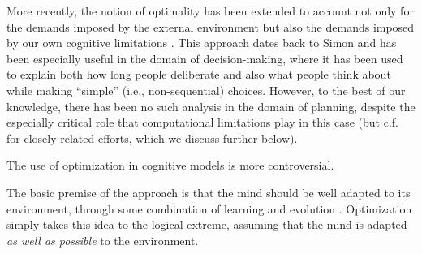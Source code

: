 More recently, the notion of optimality has been extended to account not only for the demands imposed by the external environment but also the demands imposed by our own cognitive limitations \citep{howes2009rational,lewis2014computational,gershman2015computational,griffiths2015rational,lieder2020resourcerational}. This approach dates back to Simon \citep{simon1955behavioral} and has been especially useful in the domain of decision-making, where it has been used to explain both how long people deliberate \citep{bogacz2006physics,drugowitsch2012cost,tajima2016optimal,tajima2019optimal,fudenberg2018speed} and also what people think about \citep{callaway2021fixation,jang2021optimal} while making ``simple'' (i.e., non-sequential) choices. However, to the best of our knowledge, there has been no such analysis in the domain of planning, despite the especially critical role that computational limitations play in this case (but c.f. \citep{sezener2019optimizing,mattar2018prioritized} for closely related efforts, which we discuss further below).


The use of optimization in cognitive models is more controversial. 


The basic premise of the approach is that the mind should be well adapted to its environment, through some combination of learning and evolution \citep{anderson1990adaptive}. Optimization simply takes this idea to the logical extreme, assuming that the mind is adapted \emph{as well as possible} to the environment.













